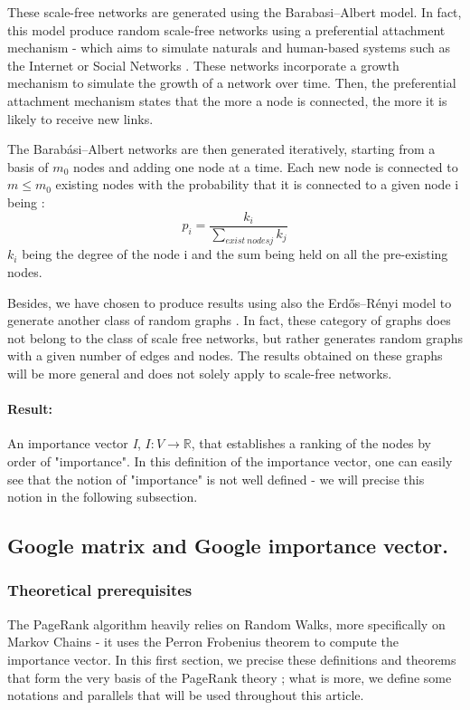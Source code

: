 \documentclass[sn-mathphys]{sn-jnl}%
\theoremstyle{thmstyleone}%
\theoremstyle{thmstyletwo}%
\theoremstyle{thmstylethree}%
\begin{document}
These scale-free networks are generated using the Barabasi–Albert
model. In fact, this model produce random scale-free networks using a
preferential attachment mechanism - which aims to simulate naturals
and human-based systems such as the Internet or Social Networks
\cite{barabasi_albert_1999, albert_barabasi_2002}. These networks
incorporate a growth mechanism to simulate the growth of a network
over time. Then, the preferential attachment mechanism states that the
more a node is connected, the more it is likely to receive new links.

The Barabási–Albert networks are then generated iteratively, starting
from a basis of $m_0$ nodes and adding one node at a time. Each new
node is connected to $m \leq m_0$ existing nodes with the probability
that it is connected to a given node i being :
\begin{equation*}
    p_i = \frac{k_i}{\sum_{exist \ nodes j} k_j}
\end{equation*}
$k_i$ being the degree of the node i and the sum being held on all the pre-existing nodes.

Besides, we have chosen to produce results using also the Erdős–Rényi
model to generate another class of random graphs \cite{erdos}. In
fact, these category of graphs does not belong to the class of scale
free networks, but rather generates random graphs with a given number
of edges and nodes. The results obtained on these graphs will be more
general and does not solely apply to scale-free networks.

\paragraph{Result:} An importance vector \emph{I},
$I:V \rightarrow \mathbb{R}$, that establishes a ranking of the nodes
by order of "importance". In this definition of the importance vector,
one can easily see that the notion of "importance" is not well defined
- we will precise this notion in the following subsection.

\subsection{Google matrix and Google importance vector.}

\subsubsection{Theoretical prerequisites}
\label{subsubsec:Theo_prepreq}
The PageRank algorithm heavily relies on Random Walks, more
specifically on Markov Chains - it uses the Perron Frobenius theorem
to compute the importance vector. In this first section, we precise
these definitions and theorems that form the very basis of the
PageRank theory ; what is more, we define some notations and parallels
that will be used throughout this article.
\end{document}
